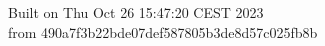 {\noindent Built on Thu Oct 26 15:47:20 CEST 2023} \\ 
 {\noindent from 490a7f3b22bde07def587805b3de8d57c025fb8b}
